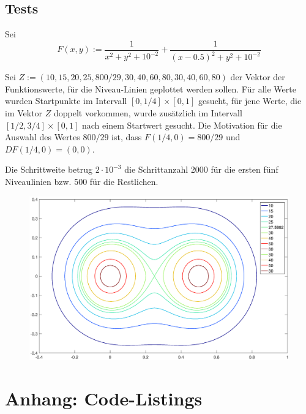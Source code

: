 \documentclass[a4paper,11pt,bibliography=totoc,listof=totoc,headinclude=true,cleardoublepage=empty,oneside]{scrartcl}
\newcommand{\R}{\mathbb{R}}
\begin{document}
\subsection{Tests}
Sei %
\[
F(x,y) := \frac{1}{x^2+y^2+10^{-2}} + \frac{1}{(x-0.5)^2+y^2+10^{-2}}
\]

Sei $Z:= (10,15,20,25,800/29,30,40,60,80,30,40,60,80)$ der Vektor der Funktionswerte, für die Niveau-Linien geplottet werden sollen. Für alle Werte wurden Startpunkte im Intervall $[0,1/4]\times[0,1]$ gesucht, für jene Werte, die im Vektor $Z$ doppelt vorkommen, wurde zusätzlich im Intervall $[1/2,3/4]\times[0,1]$ nach einem Startwert gesucht. Die Motivation für die Auswahl des Wertes $800/29$ ist, dass $F(1/4,0)=800/29$ und $DF(1/4,0)=(0,0)$.

Die Schrittweite betrug $2\cdot 10^{-3}$ die Schrittanzahl 2000 für die ersten fünf Niveaulinien bzw. 500 für die Restlichen.

\begin{figure}[H]
	\centering
	\includegraphics[trim = 41mm 0mm 35mm 0mm, clip, width=\linewidth]{plots/niveau/test5_}

\end{figure}

\section{Anhang: Code-Listings}

\end{document}
